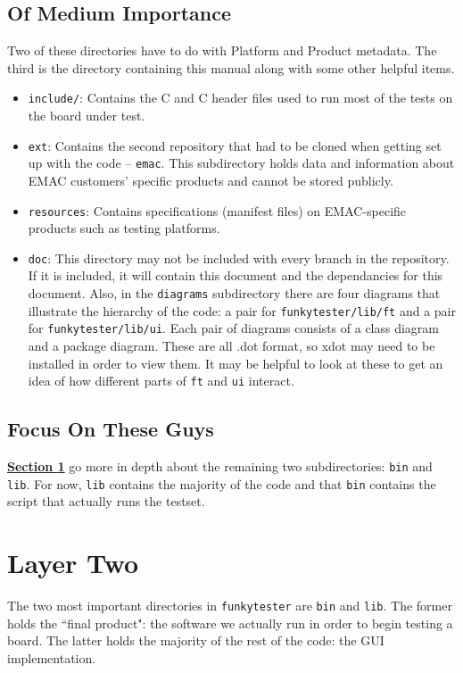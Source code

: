 \documentclass{report}
\begin{document}
\subsection{Of Medium Importance} \label{subsec:medium}
Two of these directories have to do with Platform and Product metadata. The third is the directory containing this manual along with some other helpful items.
\begin{itemize}
	\item \texttt{include/}: Contains the C and C header files used to run most of the tests on the board under test.
	\item \texttt{ext}: Contains the second repository that had to be cloned when getting set up with the code -- \texttt{emac}. This subdirectory holds data and information about EMAC customers' specific products and cannot be stored publicly.
	\item \texttt{resources}: Contains specifications (manifest files) on EMAC-specific products such as testing platforms.
	\item \texttt{doc}: This directory may not be included with every branch in the repository. If it is included, it will contain this document and the dependancies for this document. Also, in the \texttt{diagrams} subdirectory there are four diagrams that illustrate the hierarchy of the code: a pair for \texttt{funkytester/lib/ft} and a pair for \texttt{funkytester/lib/ui}. Each pair of diagrams consists of a class diagram and a package diagram. These are all .dot format, so xdot may need to be installed in order to view them. It may be helpful to look at these to get an idea of how different parts of \texttt{ft} and \texttt{ui} interact.
\end{itemize}

\subsection{Focus On These Guys}
\hyperref[sec:layer2]{\textbf{Section \ref{sec:layer2}}} go more in depth about the remaining two subdirectories: \texttt{bin} and \texttt{lib}. For now, \texttt{lib} contains the majority of the code and that \texttt{bin} contains the script that actually runs the testset.

\section{Layer Two} \label{sec:layer2}
The two most important directories in \texttt{funkytester} are \texttt{bin} and \texttt{lib}. The former holds the ``final product": the software we actually run in order to begin testing a board. The latter holds the majority of the rest of the code: the GUI implementation.
\end{document}
